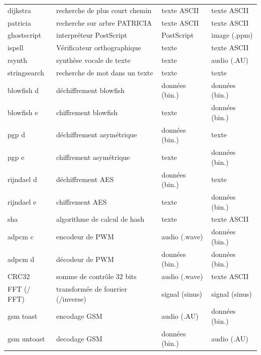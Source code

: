 \documentclass[french, a4paper, 11pt, twoside, pdftex]{StyleThese}
\begin{document}
\begin{longtable}{@{}llll@{}}
		dijkstra     & recherche de plus court chemin		& texte ASCII        & texte ASCII      \\
		patricia     & recherche sur arbre PATRICIA			& texte ASCII        & texte ASCII      \\
		ghostscript  & interpréteur PostScript              & PostScript		 & image (.ppm)     \\
		ispell       & Vérificateur orthographique          & texte              & texte ASCII		\\
		rsynth       & synthèse vocale de texte             & texte              & audio (.AU)      \\
		stringsearch & recherche de mot dans un texte		& texte              & texte            \\
		blowfish d   & déchiffrement blowfish               & données (bin.)  	 & données (bin.)   \\
		blowfish e   & chiffrement blowfish                 & texte              & données (bin.)   \\
		pgp d        & déchiffrement asymétrique      		& données (bin.)  	 & texte            \\
		pgp e        & chiffrement asymétrique				& texte              & données (bin.)   \\
		rijndael d   & déchiffrement AES                    & données (bin.)  	 & texte            \\
		rijndael e   & chiffrement AES                      & texte              & données (bin.)   \\
		sha          & algorithme de calcul de hash			& texte              & texte ASCII      \\
		adpcm c      & encodeur de PWM                      & audio (.wave)      & données (bin.)   \\
		adpcm d      & décodeur de PWM                      & données (bin.)  	 & données (bin.)   \\
		CRC32        & somme de contrôle 32 bits     		& audio (.wave)      & texte ASCII      \\
  FFT (/ FFT\up{-1}) & transformée de fourrier (/inverse)	& signal (sinus)	 & signal (sinus)	\\ 
		gsm toast    & encodage GSM                         & audio (.AU)        & données (bin.)   \\ 
		gsm untoast  & decodage GSM                         & données (bin.)     & audio (.AU)	    \\ 		
\end{longtable}
    
\end{document}
